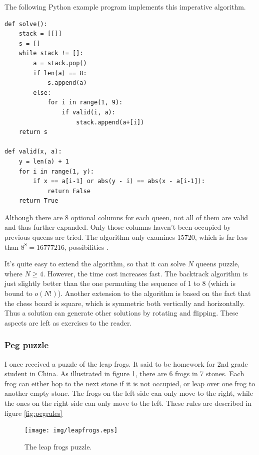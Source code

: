 \documentclass[UTF8]{article}
\begin{document}
The following Python example program implements this imperative algorithm.

\lstset{language=Python}
\begin{lstlisting}
def solve():
    stack = [[]]
    s = []
    while stack != []:
        a = stack.pop()
        if len(a) == 8:
            s.append(a)
        else:
            for i in range(1, 9):
                if valid(i, a):
                    stack.append(a+[i])
    return s

def valid(x, a):
    y = len(a) + 1
    for i in range(1, y):
        if x == a[i-1] or abs(y - i) == abs(x - a[i-1]):
            return False
    return True
\end{lstlisting}

Although there are 8 optional columns for each queen, not all of them
are valid and thus further expanded. Only those columns haven't been occupied by
previous queens are tried. The algorithm only examines 15720, which is far
less than $8^8 = 16777216$, possibilities \cite{wiki-8-queens}.

It's quite easy to extend the algorithm, so that it can solve $N$ queens puzzle, where
$N \geq 4$. However, the time cost increases fast. The backtrack algorithm is just
slightly better than the one permuting the sequence of 1 to 8 (which is bound to $o(N!)$).
Another extension to the algorithm is based on the fact that the chess board is
square, which is symmetric both vertically and horizontally. Thus a solution can
generate other solutions by rotating and flipping. These aspects are left as
exercises to the reader.

\subsubsection{Peg puzzle}
I once received a puzzle of the leap frogs. It said to be homework
for 2nd grade student in China. As illustrated in figure \ref{fig:leapfrog}, there
are 6 frogs in 7 stones. Each frog can either hop to the next stone if it is not
occupied, or leap over one frog to another empty stone. The frogs on the left side
can only move to the right, while the ones on the right side can only move to the
left. These rules are described in figure \ref{fig:pegrules}

\begin{figure}[htbp]
 \centering
 \texttt{[image: img/leapfrogs.eps]}
 \caption{The leap frogs puzzle.}
 \label{fig:leapfrog}
\end{figure}
\end{document}
